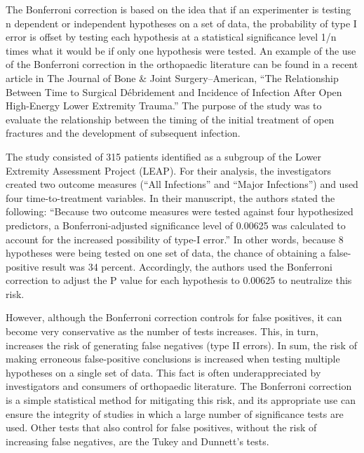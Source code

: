 The Bonferroni correction is based on the idea that if an experimenter is testing n dependent or independent hypotheses on a set of data, the probability of type I error is offset by testing each hypothesis at a statistical significance level 1/n times what it would be if only one hypothesis were tested.
An example of the use of the Bonferroni correction in the orthopaedic literature can be found in a recent article in The Journal of Bone & Joint Surgery–American, “The Relationship Between Time to Surgical Débridement and Incidence of Infection After Open High-Energy Lower Extremity Trauma.” The purpose of the study was to evaluate the relationship between the timing of the initial treatment of open fractures and the development of subsequent infection.

The study consisted of 315 patients identified as a subgroup of the Lower Extremity Assessment Project (LEAP). For their analysis, the investigators created two outcome measures (“All Infections” and “Major Infections”) and used four time-to-treatment variables. In their manuscript, the authors stated the following: “Because two outcome measures were tested against four hypothesized predictors, a Bonferroni-adjusted significance level of 0.00625 was calculated to account for the increased possibility of type-I error.” In other words, because 8 hypotheses were being tested on one set of data, the chance of obtaining a false-positive result was 34 percent. Accordingly, the authors used the Bonferroni correction to adjust the P value for each hypothesis to 0.00625 to neutralize this risk.

However, although the Bonferroni correction controls for false positives, it can become very conservative as the number of tests increases. This, in turn, increases the risk of generating false negatives (type II errors).
In sum, the risk of making erroneous false-positive conclusions is increased when testing multiple hypotheses on a single set of data. This fact is often underappreciated by investigators and consumers of orthopaedic literature. The Bonferroni correction is a simple statistical method for mitigating this risk, and its appropriate use can ensure the integrity of studies in which a large number of significance tests are used. Other tests that also control for false positives, without the risk of increasing false negatives, are the Tukey and Dunnett’s tests.
